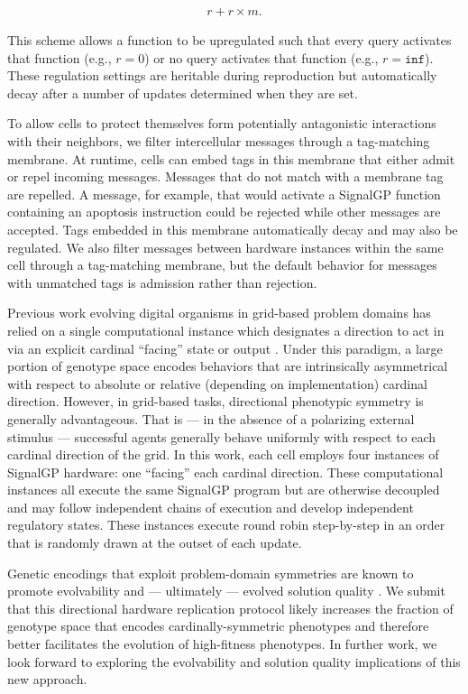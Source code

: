 \begin{align*}
r + r \times m.
\end{align*}

This scheme allows a function to be upregulated such that every query activates that function (e.g., $r = 0$) or no query activates that function (e.g., $r = \texttt{inf}$).
These regulation settings are heritable during reproduction but automatically decay after a number of updates determined when they are set.

To allow cells to protect themselves form potentially antagonistic interactions with their neighbors, we filter intercellular messages through a tag-matching membrane.
At runtime, cells can embed tags in this membrane that either admit or repel incoming messages.
Messages that do not match with a membrane tag are repelled.
A message, for example, that would activate a SignalGP function containing an apoptosis instruction could be rejected while other messages are accepted.
Tags embedded in this membrane automatically decay and may also be regulated.
We also filter messages between hardware instances within the same cell through a tag-matching membrane, but the default behavior for messages with unmatched tags is admission rather than rejection.

Previous work evolving digital organisms in grid-based problem domains has relied on a single computational instance which designates a direction to act in via an explicit cardinal ``facing'' state or output \cite{goldsby2014evolutionary, goldsby2018serendipitous, grabowski2010early, biswas2014causes, lalejini2018evolving}.
Under this paradigm, a large portion of genotype space encodes behaviors that are intrinsically asymmetrical with respect to absolute or relative (depending on implementation) cardinal direction.
However, in grid-based tasks, directional phenotypic symmetry is generally advantageous.
That is --- in the absence of a polarizing external stimulus --- successful agents generally behave uniformly with respect to each cardinal direction of the grid.
In this work, each cell employs four instances of SignalGP hardware: one ``facing'' each cardinal direction.
These computational instances all execute the same SignalGP program but are otherwise decoupled and may follow independent chains of execution and develop independent regulatory states.
These instances execute round robin step-by-step in an order that is randomly drawn at the outset of each update.

Genetic encodings that exploit problem-domain symmetries are known to promote evolvability and --- ultimately --- evolved solution quality \cite{clune2011performance, cheney2014unshackling}.
We submit that this directional hardware replication protocol likely increases the fraction of genotype space that encodes cardinally-symmetric phenotypes and therefore better facilitates the evolution of high-fitness phenotypes.
In further work, we look forward to exploring the evolvability and solution quality implications of this new approach.

